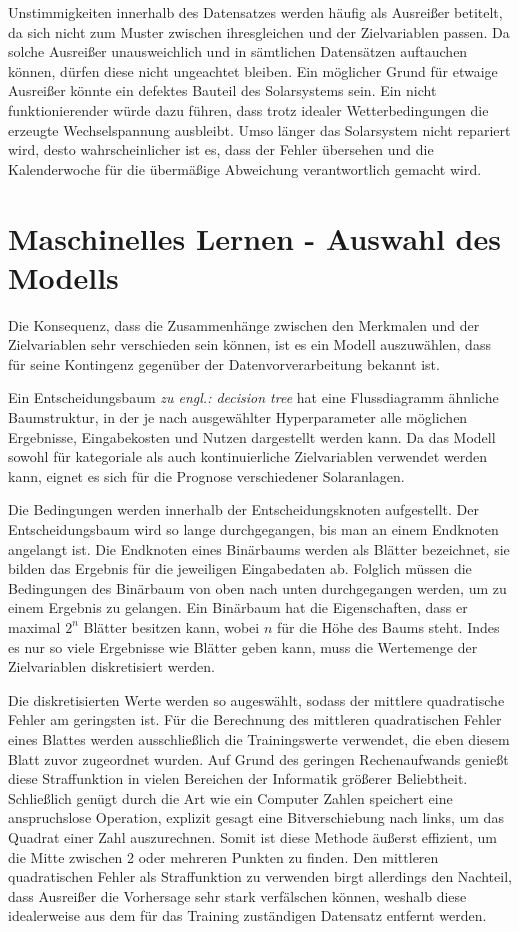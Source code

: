 \documentclass[12pt, a4paper]{article}
\begin{document}
Unstimmigkeiten innerhalb des Datensatzes werden häufig als Ausreißer betitelt, da sich nicht zum Muster zwischen ihresgleichen und der Zielvariablen passen. Da solche Ausreißer unausweichlich und in sämtlichen Datensätzen auftauchen können, dürfen diese nicht ungeachtet bleiben. Ein möglicher Grund für etwaige Ausreißer könnte ein defektes Bauteil des Solarsystems sein. Ein nicht funktionierender würde dazu führen, dass trotz idealer Wetterbedingungen die erzeugte Wechselspannung ausbleibt. Umso länger das Solarsystem nicht repariert wird, desto wahrscheinlicher ist es, dass der Fehler übersehen und die Kalenderwoche für die übermäßige Abweichung verantwortlich gemacht wird.


\newpage

\section{Maschinelles Lernen - Auswahl des Modells}

Die Konsequenz, dass die Zusammenhänge zwischen den Merkmalen und der Zielvariablen sehr verschieden sein können, ist es ein Modell auszuwählen, dass für seine Kontingenz gegenüber der Datenvorverarbeitung bekannt ist. 

Ein Entscheidungsbaum \textit{zu engl.: decision tree} hat eine Flussdiagramm ähnliche Baumstruktur, in der je nach ausgewählter Hyperparameter alle möglichen Ergebnisse, Eingabekosten und Nutzen dargestellt werden kann. Da das Modell sowohl für kategoriale als auch kontinuierliche Zielvariablen verwendet werden kann, eignet es sich für die Prognose verschiedener Solaranlagen. 

Die Bedingungen werden innerhalb der Entscheidungsknoten aufgestellt. Der Entscheidungsbaum wird so lange durchgegangen, bis man an einem Endknoten angelangt ist. Die Endknoten eines Binärbaums werden als Blätter bezeichnet, sie bilden das Ergebnis für die jeweiligen Eingabedaten ab. Folglich müssen die Bedingungen des Binärbaum von oben nach unten durchgegangen werden, um zu einem Ergebnis zu gelangen. Ein Binärbaum hat die Eigenschaften, dass er maximal $2^{n}$ Blätter besitzen kann, wobei $n$ für die Höhe des Baums steht. Indes es nur so viele Ergebnisse wie Blätter geben kann, muss die Wertemenge der Zielvariablen diskretisiert werden. 

Die diskretisierten Werte werden so augeswählt, sodass der mittlere quadratische Fehler am geringsten ist. Für die Berechnung des mittleren quadratischen Fehler eines Blattes werden ausschließlich die Trainingswerte verwendet, die eben diesem Blatt zuvor zugeordnet wurden. Auf Grund des geringen Rechenaufwands genießt diese Straffunktion in vielen Bereichen der Informatik größerer Beliebtheit. Schließlich genügt durch die Art wie ein Computer Zahlen speichert eine anspruchslose Operation, explizit gesagt eine Bitverschiebung nach links, um das Quadrat einer Zahl auszurechnen. Somit ist diese Methode äußerst effizient, um die Mitte zwischen 2 oder mehreren Punkten zu finden. Den mittleren quadratischen Fehler als Straffunktion zu verwenden birgt allerdings den Nachteil, dass Ausreißer die Vorhersage sehr stark verfälschen können, weshalb diese idealerweise aus dem für das Training zuständigen Datensatz entfernt werden.
\end{document}
